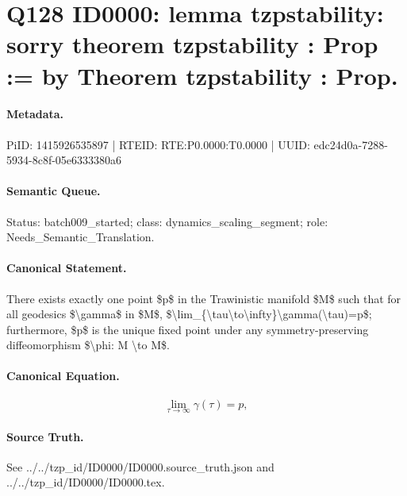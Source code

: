 \section*{Q128 ID0000: lemma tzpstability: sorry theorem tzpstability : Prop := by Theorem tzpstability : Prop.}
\paragraph{Metadata.}
PiID: 1415926535897 | RTEID: RTE:P0.0000:T0.0000 | UUID: edc24d0a-7288-5934-8c8f-05e6333380a6

\paragraph{Semantic Queue.}
Status: batch009\_started; class: dynamics\_scaling\_segment; role: Needs\_Semantic\_Translation.

\paragraph{Canonical Statement.}
There exists exactly one point \$p\$ in the Trawinistic manifold \$M\$ such that for all geodesics \$\textbackslash{}gamma\$ in \$M\$, \$\textbackslash{}lim\_\{\textbackslash{}tau\textbackslash{}to\textbackslash{}infty\}\textbackslash{}gamma(\textbackslash{}tau)=p\$; furthermore, \$p\$ is the unique fixed point under any symmetry-preserving diffeomorphism \$\textbackslash{}phi: M \textbackslash{}to M\$.

\paragraph{Canonical Equation.}
\[
\lim_{\tau\to\infty}\gamma(\tau)=p,
\]

\paragraph{Source Truth.}
See ../../tzp\_id/ID0000/ID0000.source\_truth.json and ../../tzp\_id/ID0000/ID0000.tex.
